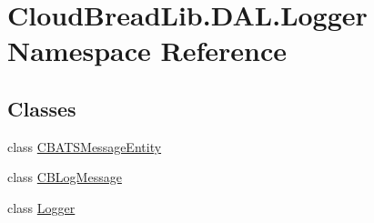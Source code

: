 \hypertarget{namespace_cloud_bread_lib_1_1_d_a_l_1_1_logger}{}\section{Cloud\+Bread\+Lib.\+D\+A\+L.\+Logger Namespace Reference}
\label{namespace_cloud_bread_lib_1_1_d_a_l_1_1_logger}
\subsection*{Classes}
\begin{DoxyCompactItemize}
\item 
class \hyperlink{class_cloud_bread_lib_1_1_d_a_l_1_1_logger_1_1_c_b_a_t_s_message_entity}{C\+B\+A\+T\+S\+Message\+Entity}
\item 
class \hyperlink{class_cloud_bread_lib_1_1_d_a_l_1_1_logger_1_1_c_b_log_message}{C\+B\+Log\+Message}
\item 
class \hyperlink{class_cloud_bread_lib_1_1_d_a_l_1_1_logger_1_1_logger}{Logger}
\end{DoxyCompactItemize}
